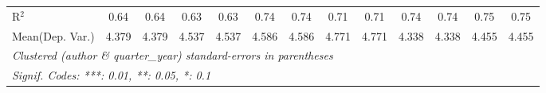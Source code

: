 \begin{tabular}{lcccccccccccc}
   R$^2$                                    & 0.64        & 0.64          & 0.63    & 0.63    & 0.74    & 0.74           & 0.71    & 0.71          & 0.74    & 0.74          & 0.75   & 0.75\\  
Mean(Dep. Var.) & 4.379 & 4.379 & 4.537 & 4.537 & 4.586 & 4.586 & 4.771 & 4.771 & 4.338 & 4.338 & 4.455 & 4.455 \\
   \midrule \midrule
   \multicolumn{13}{l}{\emph{Clustered (author \& quarter\_year) standard-errors in parentheses}}\\
   \multicolumn{13}{l}{\emph{Signif. Codes: ***: 0.01, **: 0.05, *: 0.1}}\\
\end{tabular}
\par\endgroup
